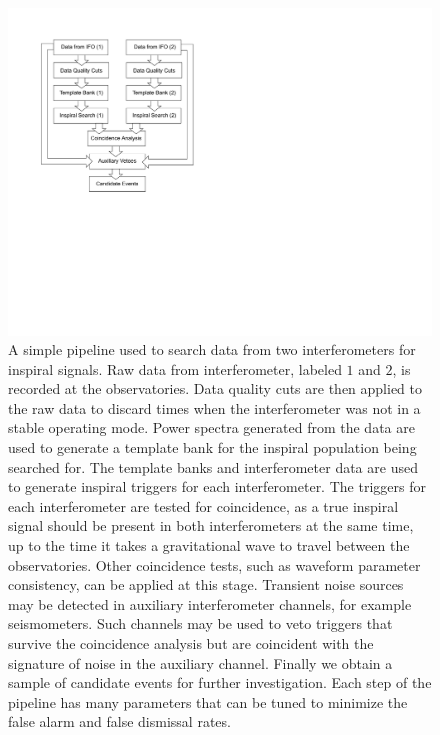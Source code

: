 \begin{figure}[p]
\label{f:simple_pipe}
\begin{center}
\includegraphics[height=0.6\textheight]{figures/pipeline/simple_pipe}
\end{center}
\caption[Simple Pipeline to Search Data From Two Interferometers]{
A simple pipeline used to search data from two interferometers for inspiral
signals. Raw data from interferometer, labeled $1$ and $2$, is recorded at the
observatories. Data quality cuts are then applied to the raw data to discard
times when the interferometer was not in a stable operating mode. Power
spectra generated from the data are used to generate a template bank for the
inspiral population being searched for. The template banks and interferometer
data are used to generate inspiral triggers for each interferometer. The
triggers for each interferometer are tested for coincidence, as a true
inspiral signal should be present in both interferometers at the same time, up
to the time it takes a gravitational wave to travel between the observatories.
Other coincidence tests, such as waveform parameter consistency, can be
applied at this stage. Transient noise sources may be detected in auxiliary
interferometer channels, for example seismometers. Such channels may be used to 
veto triggers that survive the coincidence analysis but are coincident with
the signature of noise in the auxiliary channel. Finally we obtain a sample of
candidate events for further investigation. Each step of the pipeline has many
parameters that can be tuned to minimize the false alarm and false dismissal 
rates.  
}
\end{figure}


